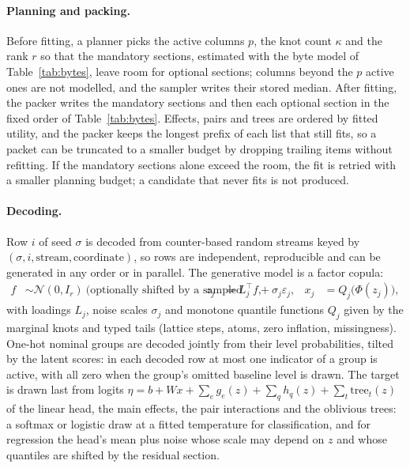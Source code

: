 \paragraph{Planning and packing.}
Before fitting, a planner picks the active columns $p$, the knot count $\kappa$ and the rank $r$ so that the mandatory sections, estimated with the byte model of Table~\ref{tab:bytes}, leave room for optional sections; columns beyond the $p$ active ones are not modelled, and the sampler writes their stored median.
After fitting, the packer writes the mandatory sections and then each optional section in the fixed order of Table~\ref{tab:bytes}.
Effects, pairs and trees are ordered by fitted utility, and the packer keeps the longest prefix of each list that still fits, so a packet can be truncated to a smaller budget by dropping trailing items without refitting.
If the mandatory sections alone exceed the room, the fit is retried with a smaller planning budget; a candidate that never fits is not produced.

\paragraph{Decoding.}
Row $i$ of seed $\sigma$ is decoded from counter-based random streams keyed by $(\sigma, i, \text{stream}, \text{coordinate})$, so rows are independent, reproducible and can be generated in any order or in parallel.
The generative model is a factor copula:
\begin{align}
  f &\sim \mathcal N(0, I_r)\ \text{(optionally shifted by a sampled regime)}, &
  z_j &= L_j^\top f + \sigma_j \varepsilon_j, &
  x_j &= Q_j\bigl(\Phi(z_j)\bigr),
\end{align}
with loadings $L_j$, noise scales $\sigma_j$ and monotone quantile functions $Q_j$ given by the marginal knots and typed tails (lattice steps, atoms, zero inflation, missingness).
One-hot nominal groups are decoded jointly from their level probabilities, tilted by the latent scores: in each decoded row at most one indicator of a group is active, with all zero when the group's omitted baseline level is drawn.
The target is drawn last from logits
$\eta = b + W x + \sum_e g_e(z) + \sum_q h_q(z) + \sum_t \mathrm{tree}_t(z)$
of the linear head, the main effects, the pair interactions and the oblivious trees: a softmax or logistic draw at a fitted temperature for classification, and for regression the head's mean plus noise whose scale may depend on $z$ and whose quantiles are shifted by the residual section.


